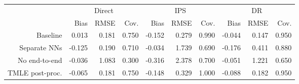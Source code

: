 \begin{tabular}{*{10}{r}} 
\toprule 
& \multicolumn{3}{c}{Direct} & \multicolumn{3}{c}{IPS} & \multicolumn{3}{c}{DR} \\ 
\cmidrule(lr){2-4} \cmidrule(lr){5-7} \cmidrule(lr){8-10} 
&  Bias &  RMSE &  Cov. &  Bias &  RMSE &  Cov. &  Bias &  RMSE &  Cov. \\ 
\midrule 
Baseline & 0.013 & 0.181 & 0.750 & -0.152 & 0.279 & 0.990 & -0.044 & 0.147 & 0.950 \\ 
Separate NNs & -0.125 & 0.190 & 0.710 & -0.034 & 1.739 & 0.690 & -0.176 & 0.411 & 0.880 \\ 
No end-to-end & -0.036 & 1.083 & 0.300 & -0.316 & 2.378 & 0.700 & -0.051 & 1.221 & 0.650 \\ 
TMLE post-proc. & -0.065 & 0.181 & 0.750 & -0.148 & 0.329 & 1.000 & -0.088 & 0.182 & 0.950 \\ 
\bottomrule 
 \end{tabular}